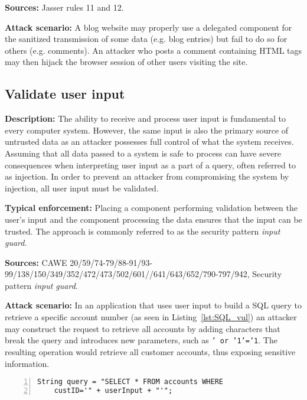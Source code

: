  \textbf{Sources:} Jasser rules 11 and 12.
 
 \textbf{Attack scenario:}
 A blog website may properly use a delegated component for the sanitized transmission of some data (e.g. blog entries) but fail to do so for others (e.g. comments). An attacker who posts a comment containing HTML tags may then hijack the browser session of other users visiting the site.

\subsection{Validate user input} 

\textbf{Description:} 
The ability to receive and process user input is fundamental to every computer system. However, the same input is also the primary source of untrusted data as an attacker possesses full control of what the system receives. Assuming that all data passed to a system is safe to process can have severe consequences when interpreting user input as a part of a query, often referred to as injection. In order to prevent an attacker from compromising the system by injection, all user input must be validated.
 
 \textbf{Typical enforcement:} 
 Placing a component performing validation between the user's input and the component processing the data ensures that the input can be trusted. The approach is commonly referred to as the security pattern \textit{input guard}.
 
 \textbf{Sources:} CAWE 20/59/74-79/88-91/93-99/138/150/349/352/472/473/502/601/\newline/641/643/652/790-797/942, Security pattern \textit{input guard}.
 
 \textbf{Attack scenario:}
 In an application that uses user input to build a SQL query to retrieve a specific account number (as seen in Listing~\ref{lst:SQL_vul}) an attacker may construct the request to retrieve all accounts by adding characters that break the query and introduces new parameters, such as \texttt{' or '1'='1}. The resulting operation would retrieve all customer accounts, thus exposing sensitive information.
 
 \begin{center}
\begin{minipage}{0.65\textwidth}
\begin{lstlisting}[caption={Example of a vulnerable SQL query.}, captionpos=b, label=lst:SQL_vul, numbers=left, showstringspaces=false]
String query = "SELECT * FROM accounts WHERE 
    custID='" + userInput + "'";
\end{lstlisting}
\end{minipage}
\end{center}

